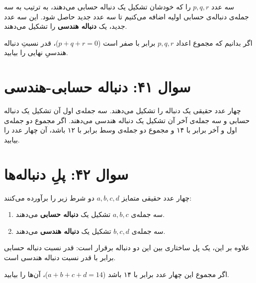 \documentclass[12pt]{article}
\begin{document}
	سه عدد \(p, q, r\) را که خودشان تشکیل یک دنباله حسابی می‌دهند، به ترتیب به سه جمله‌ی دنباله‌ی حسابی اولیه اضافه می‌کنیم تا سه عدد جدید حاصل شود. این سه عدد جدید، یک \textbf{دنباله هندسی} را تشکیل می‌دهند.
	\vspace{0.5cm}
	
	اگر بدانیم که مجموع اعداد \(p, q, r\) برابر با صفر است (\(p+q+r=0\))، قدر نسبتِ دنباله هندسیِ نهایی را بیابید.
	
	\vspace{1cm}
	\hrulefill
	\vspace{1cm}
	
	\section*{سوال ۴۱: دنباله حسابی-هندسی}
	چهار عدد حقیقی یک دنباله را تشکیل می‌دهند. سه جمله‌ی اول آن تشکیل یک دنباله حسابی و سه جمله‌ی آخر آن تشکیل یک دنباله هندسی می‌دهند. اگر مجموع دو جمله‌ی اول و آخر برابر با ۱۴ و مجموع دو جمله‌ی وسط برابر با ۱۲ باشد، آن چهار عدد را بیابید.
	
	\vspace{1cm}
	\hrulefill
	\vspace{1cm}
	
	\section*{سوال ۴۲: پلِ دنباله‌ها }
	چهار عدد حقیقی متمایز \(a, b, c, d\) دو شرط زیر را برآورده می‌کنند:
	\begin{enumerate}[label=(\roman*)]
		\item سه جمله‌ی \(a, b, c\) تشکیل یک \textbf{دنباله حسابی} می‌دهند.
		\item سه جمله‌ی \(b, c, d\) تشکیل یک \textbf{دنباله هندسی} می‌دهند.
	\end{enumerate}
	\vspace{0.5cm}
	
	علاوه بر این، یک پل ساختاری بین این دو دنباله برقرار است: قدر نسبت دنباله حسابی برابر با قدر نسبت دنباله هندسی است.
	\vspace{0.5cm}
	
	اگر مجموع این چهار عدد برابر با ۱۴ باشد (\(a+b+c+d=14\))، آن‌ها را بیابید.
	
\end{document}
